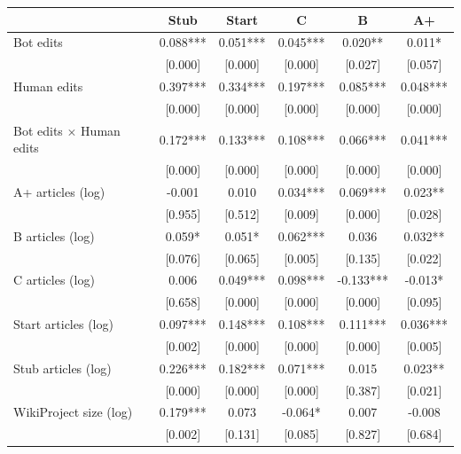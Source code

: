 {
\def\sym#1{\ifmmode^{#1}\else\(^{#1}\)\fi}
\begin{tabular}{l*{5}{c}}
\toprule
                    &\multicolumn{1}{c}{Stub}&\multicolumn{1}{c}{Start}&\multicolumn{1}{c}{C}&\multicolumn{1}{c}{B}&\multicolumn{1}{c}{A+}\\
\midrule
Bot edits           &     0.088***&     0.051***&     0.045***&     0.020** &     0.011*  \\
                    &   [0.000]   &   [0.000]   &   [0.000]   &   [0.027]   &   [0.057]   \\
Human edits         &     0.397***&     0.334***&     0.197***&     0.085***&     0.048***\\
                    &   [0.000]   &   [0.000]   &   [0.000]   &   [0.000]   &   [0.000]   \\
Bot edits $\times$ Human edits&     0.172***&     0.133***&     0.108***&     0.066***&     0.041***\\
                    &   [0.000]   &   [0.000]   &   [0.000]   &   [0.000]   &   [0.000]   \\
A+ articles (log)   &    -0.001   &     0.010   &     0.034***&     0.069***&     0.023** \\
                    &   [0.955]   &   [0.512]   &   [0.009]   &   [0.000]   &   [0.028]   \\
B articles (log)    &     0.059*  &     0.051*  &     0.062***&     0.036   &     0.032** \\
                    &   [0.076]   &   [0.065]   &   [0.005]   &   [0.135]   &   [0.022]   \\
C articles (log)    &     0.006   &     0.049***&     0.098***&    -0.133***&    -0.013*  \\
                    &   [0.658]   &   [0.000]   &   [0.000]   &   [0.000]   &   [0.095]   \\
Start articles (log)&     0.097***&     0.148***&     0.108***&     0.111***&     0.036***\\
                    &   [0.002]   &   [0.000]   &   [0.000]   &   [0.000]   &   [0.005]   \\
Stub articles (log) &     0.226***&     0.182***&     0.071***&     0.015   &     0.023** \\
                    &   [0.000]   &   [0.000]   &   [0.000]   &   [0.387]   &   [0.021]   \\
WikiProject size (log)&     0.179***&     0.073   &    -0.064*  &     0.007   &    -0.008   \\
                    &   [0.002]   &   [0.131]   &   [0.085]   &   [0.827]   &   [0.684]   \\

\end{tabular}}
